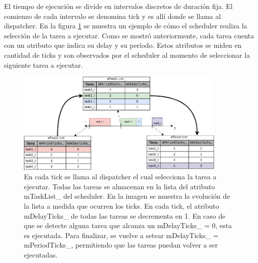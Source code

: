 
El tiempo de ejecución se divide en intervalos discretos de duración fija. El comienzo de cada intervalo se denomina tick y es allí donde se llama al dispatcher. En la figura \ref{fig:scheduler_implementacion_esquema} se muestra un ejemplo de cómo el scheduler realiza la selección de la tarea a ejecutar. Como se mostró anteriormente, cada tarea cuenta con un atributo que indica su delay y su período. Estos atributos se miden en cantidad de ticks y son observados por el scheduler al momento de seleccionar la siguiente tarea a ejecutar.

\begin{figure}[!t]
    \centering
    \includegraphics[width=0.9\textwidth]{img/scheduler_implementacion_esquema.png}
    \caption{En cada tick se llama al dispatcher el cual selecciona la tarea a ejecutar. Todas las tareas se almacenan en la lista del atributo mTaskList\_ del scheduler. En la imagen se muestra la evolución de la lista a medida que ocurren los ticks. En cada tick, el atributo mDelayTicks\_ de todas las tareas se decrementa en 1. En caso de que se detecte alguna tarea que alcanza un mDelayTicks\_ = 0, esta es ejecutada. Para finalizar, se vuelve a setear mDelayTicks\_ = mPeriodTicks\_, permitiendo que las tareas puedan volver a ser ejecutadas.}
    \label{fig:scheduler_implementacion_esquema}
\end{figure}


